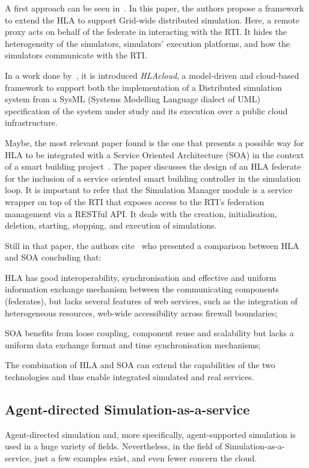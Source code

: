 \documentclass[conference]{IEEEtran}
\begin{document}
A first approach can be seen in~\cite{Xie:2005:SPH:1069810.1070184}. In this paper, the authors propose a framework to extend the HLA to support Grid-wide distributed simulation. Here, a remote proxy acts on behalf of the federate in interacting with the RTI. It hides the heterogeneity of the simulators, simulators' execution platforms, and how the simulators communicate with the RTI.

In a work done by~\cite{Bocciarelli:2013:SAF:2675983.2676156}, it is introduced \textit{HLAcloud}, a model-driven and cloud-based framework to support both the implementation of a Distributed simulation system from a SysML (Systems Modelling Language dialect of UML) specification of the system under study and its execution over a public cloud infrastructure. 

Maybe, the most relevant paper found is the one that presents a possible way for HLA to be integrated with a Service Oriented Architecture (SOA) in the context of a smart building project~\cite{Dragoicea:2012:IHS:2310096.2310200}. The paper discusses the design of an HLA federate for the inclusion of a service oriented smart building controller in the simulation loop. It is important to refer that the Simulation Manager module is a service wrapper on top of the RTI that exposes access to the RTI's federation management via a RESTful API. It deals with the creation, initialisation, deletion, starting, stopping, and execution of simulations.

Still in that paper, the authors cite~\cite{Wang:2008:SHL:2367656.2367672} who presented a comparison between HLA and SOA concluding that:
\begin{compactitem}
\item HLA has good interoperability, synchronisation and effective and uniform information exchange mechanism between the communicating components (federates), but lacks several features of web services, such as the integration of heterogeneous resources, web-wide accessibility across firewall boundaries;
\item SOA benefits from loose coupling, component reuse and scalability but lacks a uniform data exchange format and time synchronisation mechanisms;
\item The combination of HLA and SOA can extend the capabilities of the two technologies and thus enable integrated simulated and real services.
\end{compactitem}

\subsection{Agent-directed Simulation-as-a-service}
Agent-directed simulation and, more specifically, agent-supported simulation is used in a huge variety of fields. Nevertheless, in the field of Simulation-as-a-service, just a few examples exist, and even fewer concern the cloud.
\end{document}
